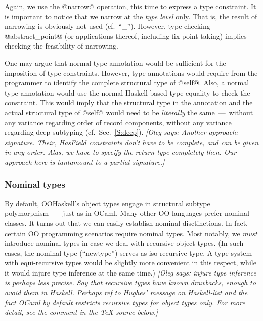 \documentclass{jfp}
\newcommand{\oleg}[1]{{\it [Oleg says: #1]}}
\begin{document}
Again, we use the @narrow@ operation, this time to express a type
constraint. It is important to notice that we narrow at the
\emph{type level} only. That is, the result of narrowing is 
obviously not used (cf.\ ``\_''). However, type-checking
@abstract_point@ (or applications thereof, including fix-point taking)
implies checking the feasibility of narrowing.

One may argue that normal type annotation would be sufficient for 
the imposition of type constraints. However, type annotations would
require from the programmer to identify the complete structural type
of @self@. Also, a normal type annotation would use the normal
Haskell-based type equality to check the constraint.  This would imply
that the structural type in the annotation and the actual structural
type of @self@ would need to be \emph{literally} the same~---~without
any variance regarding order of record components, without any
variance regarding deep subtyping (cf.\ Sec.~\ref{S:deep}).
\oleg{Another approach: signature. Their, HasField constraints don't
  have to be complete, and can be given in any order. Alas, we have to
  specify the return type completely then. Our approach here is
  tantamount to a partial signature.}





\subsubsection{Nominal types}
\label{S:nominal}

By default, OOHaskell's object types engage in structural subtype
polymorphism~---~just as in OCaml. Many other OO languages prefer
nominal classes. It turns out that we can easily establish nominal
disctinctions. In fact, certain OO programming scenarios require
nominal types. Most notably, we \emph{must} introduce nominal types in
case we deal with recursive object types.  (In such cases, the nominal
type (``newtype'') serves as iso-recursive type. A type system with
equi-recursive types would be slightly more convenient in this
respect, while it would injure type inference at the same time.)
\oleg{injure type inference is perhaps less precise. Say that
  recursive types have known drawbacks, enough to avoid them in
  Haskell. Perhaps ref to Hughes' message on Haskell-list and the fact
OCaml by default restricts recursive types for object types only.
For more detail, see the comment in the TeX source below.}
\end{document}
